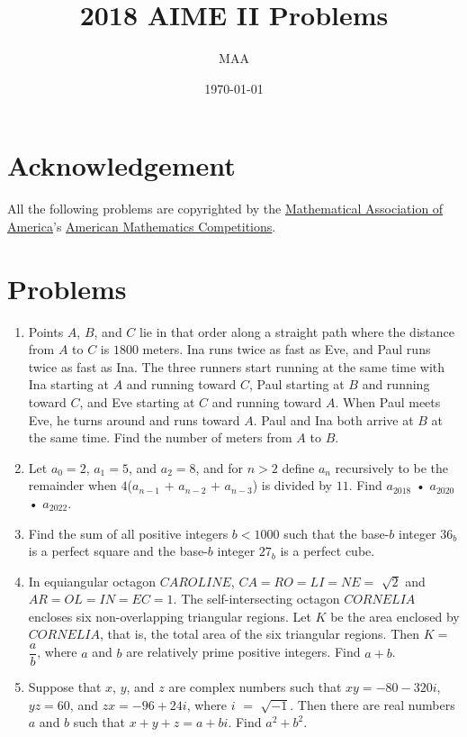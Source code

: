 \documentclass{article}%
\title{2018 AIME II Problems}%
\author{MAA}%
\date{\today}%
\begin{document}
%
\normalsize%
\maketitle%
\section{Acknowledgement}%
\label{sec:Acknowledgement}%
All the following problems are copyrighted by the \href{https://www.maa.org/}{Mathematical Association of America}'s \href{https://www.maa.org/math-competitions}{American Mathematics Competitions}.

%
\section{Problems}%
\label{sec:Problems}%
\begin{enumerate}%
\item%
[\textbf{Problem 1}]Points $A$, $B$, and $C$ lie in that order along a straight path where the distance from $A$ to $C$ is $1800$ meters. Ina runs twice as fast as Eve, and Paul runs twice as fast as Ina. The three runners start running at the same time with Ina starting at $A$ and running toward $C$, Paul starting at $B$ and running toward $C$, and Eve starting at $C$ and running toward $A$. When Paul meets Eve, he turns around and runs toward $A$. Paul and Ina both arrive at $B$ at the same time. Find the number of meters from $A$ to $B$.
%
\item%
[\textbf{Problem 2}]Let $a_{0} = 2$, $a_{1} = 5$, and $a_{2} = 8$, and for $n > 2$ define $a_{n}$ recursively to be the remainder when $4$($a_{n-1}$ $+$ $a_{n-2}$ $+$ $a_{n-3}$) is divided by $11$. Find $a_{2018}$ • $a_{2020}$ • $a_{2022}$.
%
\item%
[\textbf{Problem 3}]Find the sum of all positive integers $b < 1000$ such that the base-$b$ integer $36_{b}$ is a perfect square and the base-$b$ integer $27_{b}$ is a perfect cube.
%
\item%
[\textbf{Problem 4}]In equiangular octagon $CAROLINE$, $CA = RO = LI = NE =$ $\sqrt{2}$ and $AR = OL = IN = EC = 1$. The self-intersecting octagon $CORNELIA$ encloses six non-overlapping triangular regions. Let $K$ be the area enclosed by $CORNELIA$, that is, the total area of the six triangular regions. Then $K =$ $\dfrac{a}{b}$, where $a$ and $b$ are relatively prime positive integers. Find $a + b$.
%
\item%
[\textbf{Problem 5}]Suppose that $x$, $y$, and $z$ are complex numbers such that $xy = -80 - 320i$, $yz = 60$, and $zx = -96 + 24i$, where $i$ $=$ $\sqrt{-1}$. Then there are real numbers $a$ and $b$ such that $x + y + z = a + bi$. Find $a^2 + b^2$.

\end{enumerate}
\end{document}
